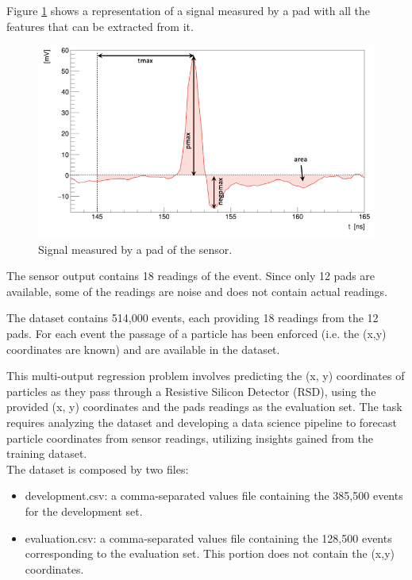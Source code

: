 \documentclass[conference]{IEEEtran}
\begin{document}
Figure \ref{fig:sensor_reading} shows a representation of a signal measured by a pad with all the features 
that can be extracted from it.\\
\begin{figure}[htbp]
\centerline{\includegraphics[width=\linewidth]{media/sensor_signal.png}}
\caption{Signal measured by a pad of the sensor.}
\label{fig:sensor_reading}
\end{figure}

The sensor output contains 18 readings of the event. Since only 12 pads are available, some of the 
readings are noise and does not contain actual readings.

The dataset contains 514,000 events, each providing 18 readings from the 12 pads. 
For each event the passage of a particle has been enforced (i.e. the (x,y) coordinates are known) 
and are available in the dataset.

This multi-output regression problem involves predicting the (x, y) coordinates of particles as they 
pass through a Resistive Silicon Detector (RSD), using the provided (x, y) coordinates and the 
pads readings as the evaluation set. 
The task requires analyzing the dataset and developing a data science pipeline to forecast particle 
coordinates from sensor readings, utilizing insights gained from the training dataset.\\

The dataset is composed by two files:
\begin{itemize}
    \item development.csv: a comma-separated values file containing the 385,500 events for the development set.
    \item evaluation.csv: a comma-separated values file containing the 128,500 events 
    corresponding to the evaluation set. 
    This portion does not contain the (x,y) coordinates.
\end{itemize}
\end{document}
